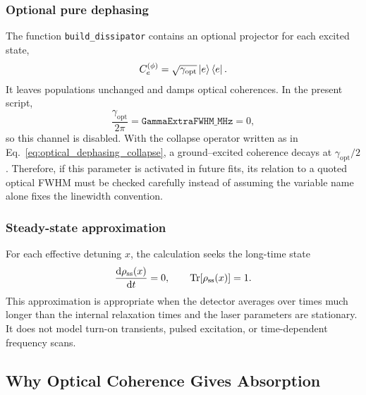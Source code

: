 \subsubsection{Optional pure dephasing}

The function \texttt{build\_dissipator} contains an optional projector for
each excited state,
\begin{equation}
C_e^{(\phi)}
=
\sqrt{\gamma_{\mathrm{opt}}}\left|e\right\rangle\left\langle e\right|.
\label{eq:optical_dephasing_collapse}
\end{equation}
It leaves populations unchanged and damps optical coherences.  In the present
script,
\begin{equation}
\frac{\gamma_{\mathrm{opt}}}{2\pi}
=\texttt{GammaExtraFWHM\_MHz}=0,
\end{equation}
so this channel is disabled.  With the collapse operator written as in
Eq.~\eqref{eq:optical_dephasing_collapse}, a ground--excited coherence decays
at \(\gamma_{\mathrm{opt}}/2\).  Therefore, if this parameter is activated in
future fits, its relation to a quoted optical FWHM must be checked carefully
instead of assuming the variable name alone fixes the linewidth convention.

\subsubsection{Steady-state approximation}

For each effective detuning \(x\), the calculation seeks the long-time state
\begin{equation}
\frac{\mathrm{d}\rho_{\mathrm{ss}}(x)}{\mathrm{d}t}=0,
\qquad
\operatorname{Tr}[\rho_{\mathrm{ss}}(x)]=1.
\label{eq:steady_state_conditions}
\end{equation}
This approximation is appropriate when the detector averages over times much
longer than the internal relaxation times and the laser parameters are
stationary.  It does not model turn-on transients, pulsed excitation, or
time-dependent frequency scans.

\subsection{Why Optical Coherence Gives Absorption}
\label{subsec:dm_coherence_absorption}

